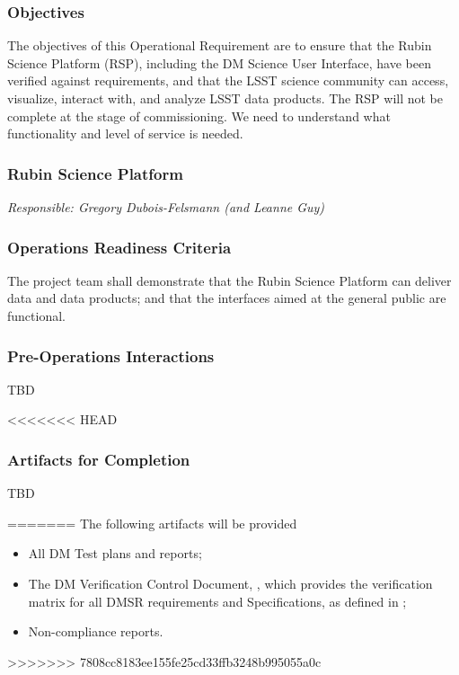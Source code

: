 \subsubsection{Objectives} 
The objectives of this Operational Requirement are to ensure that the Rubin Science Platform (RSP), including the DM Science User Interface, have been verified against requirements, and that the LSST science community can access, visualize, interact with, and analyze LSST data products. The RSP will not be complete at the stage of commissioning.  We need to understand what functionality and level of service is needed.

\subsubsection{Rubin Science Platform}
{\it Responsible: Gregory Dubois-Felsmann (and Leanne Guy)}

\subsubsection{Operations Readiness Criteria}
The project team shall demonstrate that the Rubin Science Platform can deliver data and data products; and that the interfaces aimed at the general public are functional.

\subsubsection{Pre-Operations Interactions}
TBD

<<<<<<< HEAD
\subsubsection{Artifacts for Completion}
TBD
 
=======
The following artifacts will be provided 
\begin{itemize}
\item All DM Test plans and reports;
\item The DM Verification Control Document, , which provides the verification matrix for all DMSR requirements and Specifications, as defined in ;
\item Non-compliance reports.
\end{itemize}
>>>>>>> 7808cc8183ee155fe25cd33ffb3248b995055a0c
